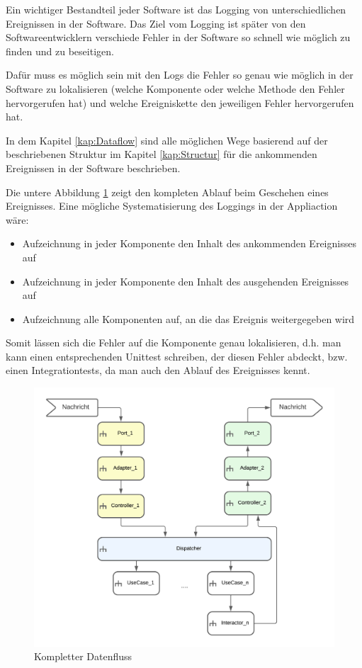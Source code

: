 Ein wichtiger Bestandteil jeder Software ist das Logging von unterschiedlichen Ereignissen in der Software.
Das Ziel vom Logging ist später von den Softwareentwicklern verschiede Fehler in der Software so schnell wie möglich zu finden und
zu beseitigen.

Dafür muss es möglich sein mit den Logs die Fehler so genau wie möglich in der Software zu lokalisieren 
(welche Komponente oder welche Methode den Fehler hervorgerufen hat) 
und welche Ereigniskette den jeweiligen Fehler hervorgerufen hat.

In dem Kapitel \ref{kap:Dataflow} sind alle möglichen Wege basierend auf der beschriebenen Struktur 
im Kapitel \ref{kap:Structur} für die ankommenden Ereignissen in der Software beschrieben.

Die untere Abbildung \ref{fig:FullDataFlow} zeigt den kompleten Ablauf beim Geschehen eines Ereignisses.
Eine mögliche Systematisierung des Loggings in der Appliaction wäre: 
\begin{itemize}
    \item Aufzeichnung in jeder Komponente den Inhalt des ankommenden Ereignisses auf
    \item Aufzeichnung in jeder Komponente den Inhalt des ausgehenden Ereignisses auf
    \item Aufzeichnung alle Komponenten auf, an die das Ereignis weitergegeben wird
\end{itemize}

Somit lässen sich die Fehler auf die Komponente genau lokalisieren, d.h. man kann einen entsprechenden Unittest schreiben, 
der diesen Fehler abdeckt, bzw. einen Integrationtests, da man auch den Ablauf des Ereignisses kennt.

\begin{figure}[H]
    \centering
    \includegraphics[width=12cm]{./images/FullDataFlow.png}
     \caption[Kompletter Datenfluss]{Kompletter Datenfluss}
     \label{fig:FullDataFlow}
\end{figure}
